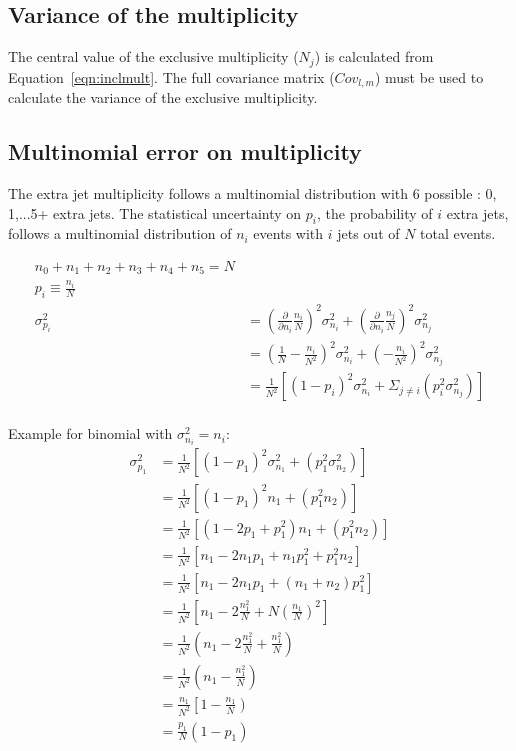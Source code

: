 \subsection{Variance of the multiplicity}
The central value of the exclusive multiplicity ($N_j$) is calculated from Equation~\ref{eqn:inclmult}. The full covariance matrix ($Cov_{l,m}$) must be used to calculate the variance of the exclusive multiplicity. 



\subsection{Multinomial error on multiplicity}
The extra jet multiplicity follows a multinomial distribution with 6 possible : 0, 1,...5+ extra jets. The statistical uncertainty on $p_i$, the probability of $i$ extra jets, follows a multinomial distribution of $n_i$ events with $i$ jets out of $N$ total events.

\begin{align*}
n_0+n_1+n_2+n_3+n_4+n_5=N \\
p_i \equiv \frac{n_i}{N} \\
\sigma^2_{p_i}&= \left( \frac{\partial}{\partial n_i } \frac{n_i}{N} \right)^2 \sigma^2_{n_i} +\left( \frac{\partial}{\partial n_i } \frac{n_j}{N} \right)^2 \sigma^2_{n_j} \\
&=\left( \frac{1}{N}- \frac{n_i}{N^2} \right)^2 \sigma^2_{n_i} +\left( - \frac{n_i}{N^2} \right)^2 \sigma^2_{n_j} \\
&= \frac{1}{N^2} \left[ \left( 1-p_i\right)^2\sigma^2_{n_i} + \Sigma_{j \neq i} \left(p_i^2 \sigma^2_{n_j} \right ) \right] \\
\end{align*}

Example for binomial with $\sigma^2_{n_i} =n_i$:
\begin{align*}
\sigma^2_{p_1}&= \frac{1}{N^2} \left[ \left( 1-p_1\right)^2\sigma^2_{n_1} + \left(p_1^2 \sigma^2_{n_2} \right ) \right ] \\
&= \frac{1}{N^2} \left[ \left( 1-p_1\right)^2 n_1 + \left(p_1^2 n_2 \right ) \right ] \\
&= \frac{1}{N^2} \left[ \left( 1-2p_1+p_1^2\right) n_1 + \left(p_1^2 n_2 \right ) \right ] \\
&= \frac{1}{N^2} \left[ n_1-2n_1p_1+n_1p_1^2+p_1^2 n_2\right]  \\
&= \frac{1}{N^2} \left[ n_1-2n_1p_1+\left(n_1+n_2 \right)p_1^2\right] \\
&= \frac{1}{N^2} \left[ n_1-2\frac{n_1^2}{N}+N\left(\frac{n_1}{N}\right)^2\right] \\
&= \frac{1}{N^2} \left( n_1-2\frac{n_1^2}{N}+\frac{n_1^2}{N}\right) \\
&= \frac{1}{N^2} \left( n_1-\frac{n_1^2}{N}\right) \\
&= \frac{n_1}{N^2} \left[ 1-\frac{n_1}{N}\right) \\
&= \frac{p_1}{N} \left( 1-p_1\right) \\
\label{eqn:binom}
\end{align*}

